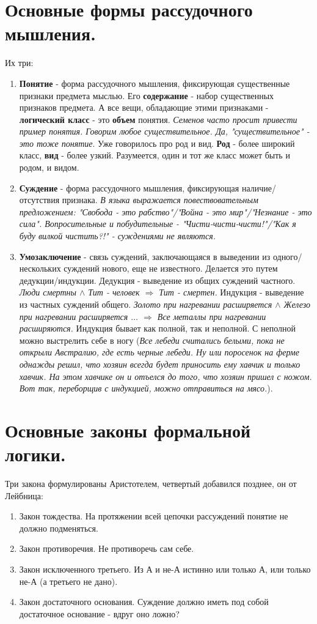 \section{ Основные формы рассудочного мышления.}
Их три:
\begin{enumerate}
\item \textbf{Понятие} -
форма рассудочного мышления, фиксирующая существенные признаки предмета мыслью. Его \textbf{содержание} - набор существенных признаков предмета. А все вещи, обладающие этими признаками - \textbf{логический класс} - это \textbf{объем} понятия. \textit{Семенов часто просит привести пример понятия. Говорим любое существительное. Да, "существительное" - это тоже понятие}. Уже говорилось про род и вид. \textbf{Род} - более широкий класс, \textbf{вид} - более узкий. Разумеется, один и тот же класс может быть и родом, и видом.
\item \textbf{Суждение} - форма рассудочного мышления, фиксирующая наличие/отсутствия признака. \textit{В языка выражается повествовательным предложением: "Свобода - это рабство"/"Война - это мир"/"Незнание  - это сила". Вопросительные и побудительные - "Чисти-чисти-чисти!"/"Как я буду вилкой чистить?!" - суждениями не являются.}
\item \textbf{Умозаключение} - связь суждений, заключающаяся в выведении из одного/нескольких суждений нового, еще не известного. Делается это путем дедукции/индукции. Дедукция - выведение из общих суждений частного. \textit{Люди смертны $\wedge$ Тит - человек $\Rightarrow$ Тит - смертен.}
Индукция - выведение из частных суждений общего. \textit{Золото при нагревании расширяется $\wedge$ Железо при нагревании расширяется $\ldots$ $\Rightarrow$ Все металлы при нагревании расширяются.} Индукция бывает как полной, так и неполной. С неполной можно выстрелить себе в ногу (\textit{Все лебеди считались белыми, пока не открыли Австралию, где есть черные лебеди. Ну или поросенок на ферме однажды решил, что хозяин всегда будет приносить ему хавчик и только хавчик. На этом хавчике он и отъелся до того, что хозяин пришел с ножом. Вот так, переборщив с индукцией, можно отправиться на мясо.}).
\end{enumerate}

\section{ Основные законы формальной логики.}
Три закона формулированы Аристотелем, четвертый добавился позднее, он от Лейбница:
\begin{enumerate}
\item Закон тождества. На протяжении всей цепочки рассуждений понятие не должно подменяться.
\item Закон противоречия. Не противоречь сам себе.
\item Закон исключенного третьего. Из А и не-А истинно или только А, или только не-А (а третьего не дано).
\item Закон достаточного основания. Суждение должно иметь под собой достаточное основание - вдруг оно ложно?
\end{enumerate}

